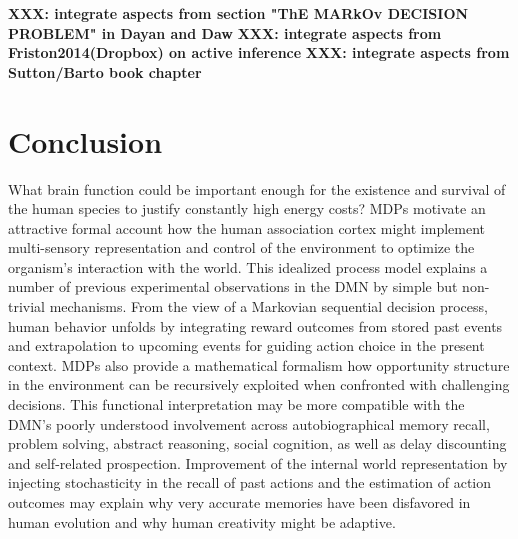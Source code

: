 \documentclass[10pt,letterpaper]{article}
\def\W{\mathbf{W}}
\begin{document}

\textbf{XXX: integrate aspects from section "ThE MARkOv DECISION PROBLEM" in Dayan and Daw}
\textbf{XXX: integrate aspects from Friston2014(Dropbox) on active inference}
\textbf{XXX: integrate aspects from Sutton/Barto book chapter}

\section{Conclusion}
What brain function could be important enough
for the existence and survival of the human species
to justify constantly high energy costs?
MDPs motivate an attractive
formal account how the human association cortex
might implement multi-sensory representation and control of the environment to
optimize the organism's interaction with the world.
This idealized process model explains
a number of previous experimental observations in the
DMN by simple but non-trivial mechanisms.
%
From the view of a Markovian sequential decision process,
human behavior unfolds by integrating reward outcomes from stored past events
and extrapolation to
upcoming events for guiding action choice in the present context.
MDPs also provide a mathematical formalism how
opportunity structure in the environment can be recursively exploited
when confronted with challenging decisions.
%
This functional interpretation may be more compatible with the DMN's
poorly understood involvement across
autobiographical memory recall, problem solving,
abstract reasoning, social cognition,
as well as delay discounting and self-related prospection.
Improvement of the internal world representation
by injecting stochasticity in the recall of past
actions and the estimation of action outcomes may explain why
very accurate memories have been disfavored in human evolution
and why human creativity might be adaptive.
\end{document}
